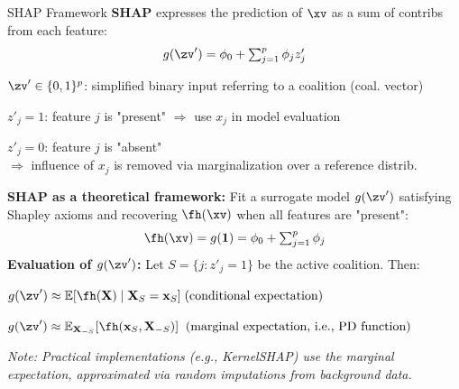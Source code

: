\documentclass[10pt,compress,t,notes=noshow, xcolor=table]{beamer}
\begin{document}
\begin{framev}[align=top]{SHAP Framework }
\textbf{SHAP} expresses the prediction of $\xv$ as a sum of contribs from each feature:
$$
g(\zv') = \phi_0 + \textstyle\sum_{j=1}^p \phi_j z'_j
$$
\begin{itemizeM}
\item $\zv' \in \{0,1\}^p$: simplified binary input referring to a coalition (coal. vector)
\item $z'_j = 1$: feature $j$ is "present" $\Rightarrow$ use $x_j$ in model evaluation
\item $z'_j = 0$: feature $j$ is "absent"\\
$\Rightarrow$ influence of $x_j$ is removed via marginalization over a reference distrib.%
\end{itemizeM}
\pause
\textbf{SHAP as a theoretical framework:} Fit a surrogate model $g(\zv')$ satisfying Shapley axioms and recovering $\fh(\xv)$ when all features are "present":
$$
\fh(\xv) = g(\mathbf{1}) = \phi_0 + \textstyle\sum_{j=1}^p \phi_j
$$
\textbf{Evaluation of $g(\zv')$:} Let $S = \{ j : z'_j = 1 \}$ be the active coalition. Then:
\begin{itemizeM}
\item $g(\zv') \approx \mathbb{E}[ \fh(\mathbf{X}) \mid \mathbf{X}_S = \mathbf{x}_S]\;\text{(conditional expectation)}$
\item $g(\zv') \approx \mathbb{E}_{\mathbf{X}_{-S}} [ \fh(\mathbf{x}_S, \mathbf{X}_{-S}) ] \;\;\text{(marginal expectation, i.e., PD function)}$
\item \textit{Note: Practical implementations (e.g., KernelSHAP) use the marginal expectation, approximated via random imputations from background data.}
\end{itemizeM}
\end{framev}
\end{document}
